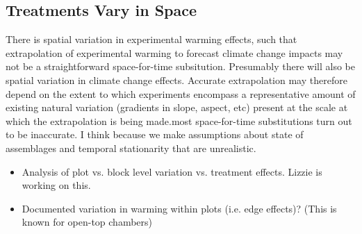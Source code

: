 \documentclass{article}
\begin{document}
\subsection {Treatments Vary in Space}
There is spatial variation in experimental warming effects, such that extrapolation of experimental warming to forecast climate change impacts may not be a straightforward space-for-time subsitution. Presumably there will also be spatial variation in climate change effects.  Accurate extrapolation may therefore depend on the extent to which experiments encompass a representative amount of existing natural variation (gradients in slope, aspect, etc) present at the scale at which the extrapolation is being made.most space-for-time substitutions turn out to be inaccurate. I think because we make assumptions about state of assemblages and temporal stationarity that are unrealistic.
\begin{itemize}
\item Analysis of plot vs. block level variation vs. treatment effects. Lizzie is working on this.
\item Documented variation in warming within plots (i.e. edge effects)? (This is known for open-top chambers)
\end{itemize}
\end{document}
